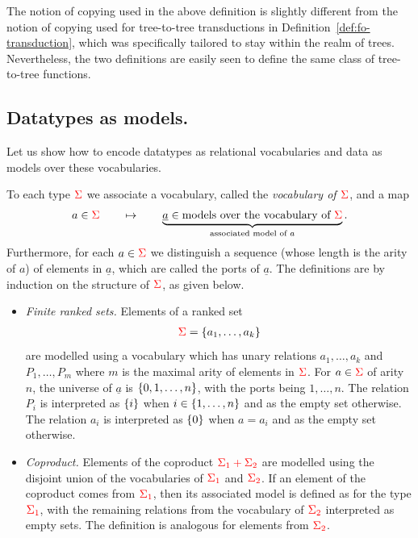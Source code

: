 The notion of copying used in the above definition is slightly different from the notion of copying used for tree-to-tree transductions in Definition~\ref{def:fo-transduction}, which was specifically tailored to stay within the realm of trees. Nevertheless, the two definitions are easily seen to define the same class of tree-to-tree functions.
 
\subsection{Datatypes  as models.}\label{sec:data-as-models}
Let us show how to encode datatypes as relational vocabularies and data as models over these vocabularies. 
\begin{definition} \label{def:type-model} To each type  ${\color{red}{\Sigma}}$ we associate a vocabulary, called the \emph{vocabulary of ${\color{red}{\Sigma}}$}, and a map 
    \begin{align*}
        a \in {\color{red}{\Sigma}} \qquad \mapsto \qquad \underbrace{\underline a \in \text{models over the  vocabulary of  ${\color{red}{\Sigma}}$}}_{\text{associated model of $a$}}.
    \end{align*}
    Furthermore, for each $a \in {\color{red}{\Sigma}}$ we  distinguish a  sequence (whose length is the arity of $a$) of elements in $\underline a$, which are called the ports of $\underline a$.   The definitions are by induction on the structure of ${\color{red}{\Sigma}}$, as given below.
    \begin{itemize}
        \item \emph{Finite ranked sets.} Elements of a ranked set   \begin{align*}
        {\color{red}{\Sigma}} =  \{a_1,\ldots,a_k\}
        \end{align*} are modelled  using a vocabulary which has unary relations $a_1,\ldots,a_k$ and $P_1,\ldots,P_m$ where $m$ is the maximal arity of elements in ${\color{red}{\Sigma}}$. 
        For $a \in {\color{red}{\Sigma}}$ of arity $n$, the  universe of $\underline a$ is $\{0,1,\ldots,n\}$, with the ports being $1,\ldots,n$. 
            The  relation $P_i$  is interpreted as $\{i\}$ when $i \in \{1,\ldots,n\}$ and as the empty set otherwise. The relation $a_i$ is interpreted as $\{0\}$ when $a = a_i$ and as the empty set otherwise. 
        \item \emph{Coproduct.}  Elements of the coproduct ${\color{red}{\Sigma_1 + \Sigma_2}}$ are modelled using the disjoint union of the vocabularies of ${\color{red}{\Sigma_1}}$ and ${\color{red}{\Sigma_2}}$. 
            If an element of the coproduct comes from ${\color{red}{\Sigma_1}}$, then its associated model is defined as for the type ${\color{red}{\Sigma_1}}$, with  the remaining relations from the vocabulary of   ${\color{red}{\Sigma_2}}$ interpreted   as empty sets. The definition is analogous for  elements from ${\color{red}{\Sigma_2}}$. 

\end{itemize}
\end{definition}
